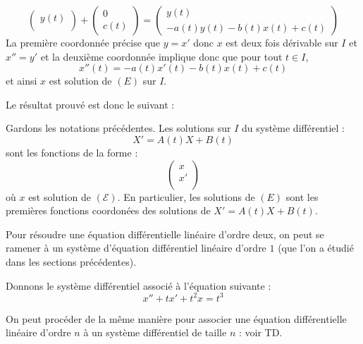 \documentclass[a4paper,10pt]{report}
\begin{document}
\begin{itemize}
$$\begin{pmatrix}
y(t) \\
\end{pmatrix} + \begin{pmatrix}
0 \\
c(t)
\end{pmatrix} = \begin{pmatrix}
y(t) \\
-a(t) y(t)-b(t)x(t)+c(t)
\end{pmatrix}$$
La première coordonnée précise que $y=x'$ donc $x$ est deux fois dérivable sur $I$ et $x''=y'$ et la deuxième coordonnée implique donc que pour tout $t \in I$,
$$ x''(t)= -a(t)x'(t)-b(t)x(t)+c(t)$$
et ainsi $x$ est solution de $(E)$ sur $I$.
\end{itemize}

\medskip

Le résultat prouvé est donc le suivant :

\begin{Proposition}{} Gardons les notations précédentes. Les solutions sur $I$ du système différentiel :
$$ X'= A(t)X+B(t) $$
sont les fonctions de la forme :
$$ \begin{pmatrix}
x \\
x' \\
\end{pmatrix}$$
où $x$ est solution de $(\mathcal{E})$. En particulier, les solutions de $(E)$ sont les premières fonctions coordonées des solutions de $X'=A(t)X+B(t)$.
\end{Proposition}

\begin{retenir} Pour résoudre une équation différentielle linéaire d'ordre deux, on peut se ramener à un système d'équation différentiel linéaire d'ordre $1$ (que l'on a étudié dans les sections précédentes).
\end{retenir}

\begin{Exemple} Donnons le système différentiel associé à l'équation suivante :
$$ x''+tx'+t^2x=t^3$$

\vspace{4cm}
\end{Exemple}

\begin{Remarque}{} On peut procéder de la même manière pour associer une équation différentielle linéaire d'ordre $n$ à un système différentiel de taille $n$ : voir TD.
\end{Remarque}

\medskip
\end{document}
